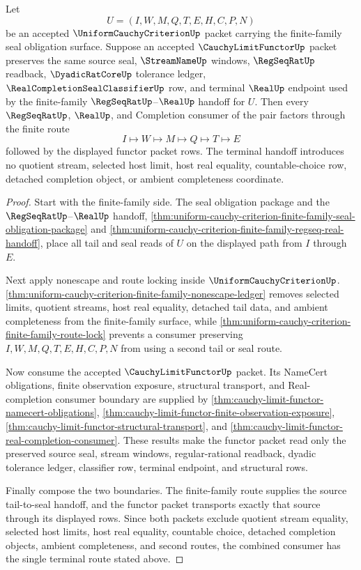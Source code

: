\begin{theorem}
\label{thm:uniform-cauchy-criterion-cauchy-limit-functor-handoff}
Let
$$
U=(I,W,M,Q,T,E,H,C,P,N)
$$
be an accepted $\UniformCauchyCriterionUp$ packet carrying the finite-family
seal obligation surface. Suppose an accepted $\CauchyLimitFunctorUp$ packet
preserves the same source seal, $\StreamNameUp$ windows, $\RegSeqRatUp$
readback, $\DyadicRatCoreUp$ tolerance ledger,
$\RealCompletionSealClassifierUp$ row, and terminal $\RealUp$ endpoint used by
the finite-family $\RegSeqRatUp$--$\RealUp$ handoff for $U$. Then every
$\RegSeqRatUp$, $\RealUp$, and Completion consumer of the pair factors through
the finite route
$$
I \longmapsto W \longmapsto M \longmapsto Q \longmapsto T \longmapsto E
$$
followed by the displayed functor packet rows. The terminal handoff introduces
no quotient stream, selected host limit, host real equality, countable-choice
row, detached completion object, or ambient completeness coordinate.
\end{theorem}
\begin{proof}
Start with the finite-family side. The seal obligation package and the
$\RegSeqRatUp$--$\RealUp$ handoff,
\autoref{thm:uniform-cauchy-criterion-finite-family-seal-obligation-package}
and \autoref{thm:uniform-cauchy-criterion-finite-family-regseq-real-handoff},
place all tail and seal reads of $U$ on the displayed path from $I$ through
$E$.

Next apply nonescape and route locking inside $\UniformCauchyCriterionUp$.
\autoref{thm:uniform-cauchy-criterion-finite-family-nonescape-ledger} removes
selected limits, quotient streams, host real equality, detached tail data, and
ambient completeness from the finite-family surface, while
\autoref{thm:uniform-cauchy-criterion-finite-family-route-lock} prevents a
consumer preserving $I,W,M,Q,T,E,H,C,P,N$ from using a second tail or seal
route.

Now consume the accepted $\CauchyLimitFunctorUp$ packet. Its NameCert
obligations, finite observation exposure, structural transport, and
Real-completion consumer boundary are supplied by
\autoref{thm:cauchy-limit-functor-namecert-obligations},
\autoref{thm:cauchy-limit-functor-finite-observation-exposure},
\autoref{thm:cauchy-limit-functor-structural-transport}, and
\autoref{thm:cauchy-limit-functor-real-completion-consumer}. These results
make the functor packet read only the preserved source seal, stream windows,
regular-rational readback, dyadic tolerance ledger, classifier row, terminal
endpoint, and structural rows.

Finally compose the two boundaries. The finite-family route supplies the
source tail-to-seal handoff, and the functor packet transports exactly that
source through its displayed rows. Since both packets exclude quotient stream
equality, selected host limits, host real equality, countable choice, detached
completion objects, ambient completeness, and second routes, the combined
consumer has the single terminal route stated above.
\end{proof}

